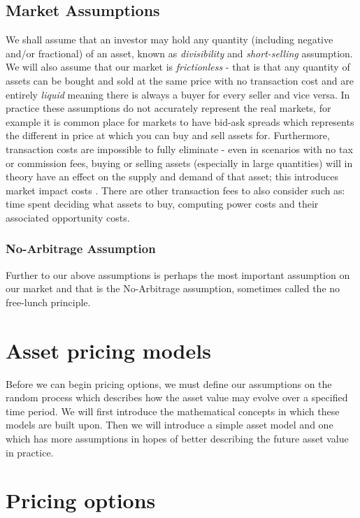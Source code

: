\subsection{Market Assumptions}

We shall assume that an investor may hold any quantity (including negative and/or fractional) of an asset, known as \textit{divisibility} and \textit{short-selling} assumption. We will also assume that our market is \textit{frictionless} - that is that any quantity of assets can be bought and sold at the same price with no transaction cost and are entirely \textit{liquid} meaning there is always a buyer for every seller and vice versa.
\nline
In practice these assumptions do not accurately represent the real markets, for example it is common place for markets to have bid-ask spreads which represents the different in price at which you can buy and sell assets for. Furthermore, transaction costs are impossible to fully eliminate - even in scenarios with no tax or commission fees, buying or selling assets (especially in large quantities) will in theory have an effect on the supply and demand of that asset; this introduces market impact costs \cite{moro2009market}. There are other transaction fees to also consider such as: time spent deciding what assets to buy, computing power costs and their associated opportunity costs.

\subsubsection{No-Arbitrage Assumption}

Further to our above assumptions is perhaps the most important assumption on our market and that is the No-Arbitrage assumption, sometimes called the no free-lunch principle.

\section{Asset pricing models}

Before we can begin pricing options, we must define our assumptions on the random process which describes how the asset value may evolve over a specified time period. We will first introduce the mathematical concepts in which these models are built upon. Then we will introduce a simple asset model and one which has more assumptions in hopes of better describing the future asset value in practice.

\section{Pricing options}

